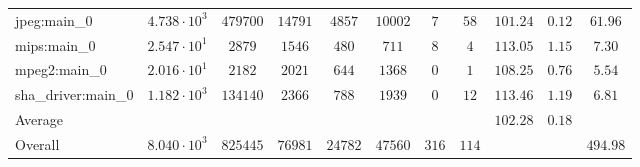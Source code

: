 \begin{tabular}{|l|c|c|c|c|c|c|c|c|c|c|}
jpeg:main\_0            & $ 4.738 \cdot 10^{3} $ & $ 479700 $ & $ 14791 $ & $ 4857  $ & $ 10002 $ & $ 7   $ & $ 58  $ & $ 101.24      $ & $ 0.12    $ & $ 61.96   $ \\
mips:main\_0            & $ 2.547 \cdot 10^{1} $ & $ 2879   $ & $ 1546  $ & $ 480   $ & $ 711   $ & $ 8   $ & $ 4   $ & $ 113.05      $ & $ 1.15    $ & $ 7.30    $ \\
mpeg2:main\_0           & $ 2.016 \cdot 10^{1} $ & $ 2182   $ & $ 2021  $ & $ 644   $ & $ 1368  $ & $ 0   $ & $ 1   $ & $ 108.25      $ & $ 0.76    $ & $ 5.54    $ \\
sha\_driver:main\_0     & $ 1.182 \cdot 10^{3} $ & $ 134140 $ & $ 2366  $ & $ 788   $ & $ 1939  $ & $ 0   $ & $ 12  $ & $ 113.46      $ & $ 1.19    $ & $ 6.81    $ \\
\hline
Average                 & $                    $ & $        $ & $       $ & $       $ & $       $ & $     $ & $     $ & $ 102.28      $ & $ 0.18    $ & $         $ \\
\hline
Overall                 & $ 8.040 \cdot 10^{3} $ & $ 825445 $ & $ 76981 $ & $ 24782 $ & $ 47560 $ & $ 316 $ & $ 114 $ & $             $ & $         $ & $ 494.98  $ \\
\hline
\end{tabular}
